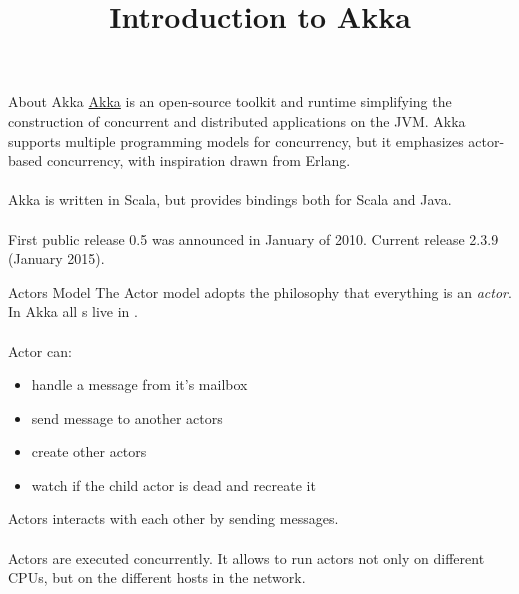 

\title{Introduction to Akka}



\begin{frame}
    \titlepage
\end{frame}


\begin{frame}{About Akka}
\href{http://www.akka.io}{Akka} is an open-source toolkit and runtime simplifying the construction of concurrent
and distributed applications on the JVM. Akka supports multiple programming models
for concurrency, but it emphasizes actor-based concurrency, with inspiration drawn from Erlang.\\~\\

Akka is written in Scala, but provides bindings both for Scala and Java.\\~\\

First public release 0.5 was announced in January of 2010. Current release 2.3.9 (January 2015).
\end{frame}


\begin{frame}{Actors Model}
The Actor model adopts the philosophy that everything is an \emph{actor}.  In Akka all s
live in .\\~\\

Actor can:
\begin{itemize}
\item handle a message from it's mailbox
\item send message to another actors
\item create other actors
\item watch if the child actor is dead and recreate it
\end{itemize}
Actors interacts with each other  by sending messages.\\~\\

Actors are executed concurrently.  It allows to run actors not only on different CPUs, but on the
different hosts in the network.
\end{frame}

